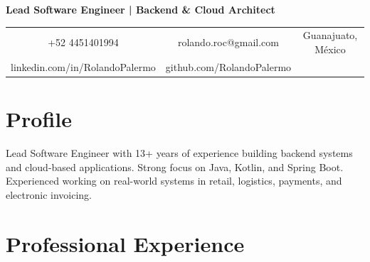 \documentclass[11pt,a4paper,sans]{moderncv}
\begin{document}
\makecvtitle

\vspace*{-10mm}

\begin{center}
\textbf{Lead Software Engineer | Backend \& Cloud Architect}
\end{center}

\begin{center}
\begin{tabular}{c c c}
+52 4451401994 & rolando.roc@gmail.com & Guanajuato, México \\
linkedin.com/in/RolandoPalermo & github.com/RolandoPalermo &
\end{tabular}
\end{center}

\section{Profile}
Lead Software Engineer with 13+ years of experience building backend systems and cloud-based applications. Strong focus on Java, Kotlin, and Spring Boot. Experienced working on real-world systems in retail, logistics, payments, and electronic invoicing.

\section{Professional Experience}
\end{document}
